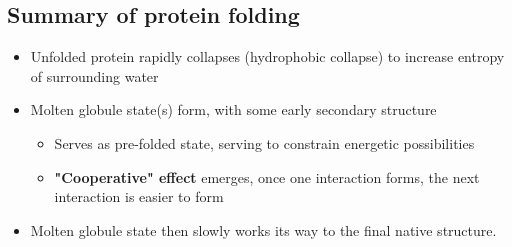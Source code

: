 \documentclass[10pt]{article}
\begin{document}
\subsection*{Summary of protein folding}
\begin{itemize}
    \item Unfolded protein rapidly collapses (hydrophobic collapse) to increase entropy of surrounding water
    \item Molten globule state(s) form, with some early secondary structure
    \begin{itemize}
        \item Serves as pre-folded state, serving to constrain energetic possibilities
        \item \textbf{"Cooperative" effect} emerges, once one interaction forms, the next interaction is easier to form
    \end{itemize}
    \item Molten globule state then slowly works its way to the final native structure.
\end{itemize}
\end{document}
